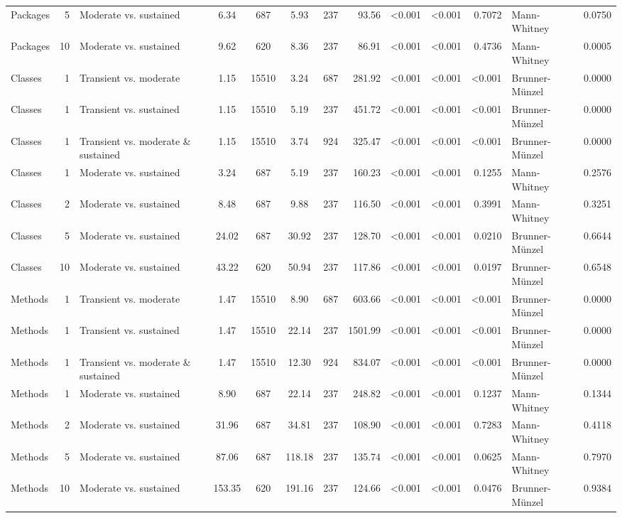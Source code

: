 \begin{table}[H]
{\begin{tabular}{l r p{4cm} c c c c r r r r l r}
Packages & 5 & Moderate vs. sustained &  6.34 & 687 & 5.93 & 237 & 93.56 & \textless 0.001 & \textless 0.001 & 0.7072 &  Mann-Whitney & 0.0750 \\ 
Packages & 10 & Moderate vs. sustained &  9.62 & 620 & 8.36 & 237 & 86.91 & \textless 0.001 & \textless 0.001 & 0.4736 &  Mann-Whitney & 0.0005 \\ 
Classes & 1 & Transient vs. moderate &  1.15 & 15510 & 3.24 & 687 & 281.92 & \textless 0.001 & \textless 0.001 & \textless 0.001 &  Brunner-Münzel & 0.0000 \\ 
Classes & 1 & Transient vs. sustained &  1.15 & 15510 & 5.19 & 237 & 451.72 & \textless 0.001 & \textless 0.001 & \textless 0.001 &  Brunner-Münzel & 0.0000 \\ 
Classes & 1 & Transient vs. moderate \& sustained &  1.15 & 15510 & 3.74 & 924 & 325.47 & \textless 0.001 & \textless 0.001 & \textless 0.001 &  Brunner-Münzel & 0.0000 \\ 
Classes & 1 & Moderate vs. sustained &  3.24 & 687 & 5.19 & 237 & 160.23 & \textless 0.001 & \textless 0.001 & 0.1255 &  Mann-Whitney & 0.2576 \\ 
Classes & 2 & Moderate vs. sustained &  8.48 & 687 & 9.88 & 237 & 116.50 & \textless 0.001 & \textless 0.001 & 0.3991 &  Mann-Whitney & 0.3251 \\ 
Classes & 5 & Moderate vs. sustained &  24.02 & 687 & 30.92 & 237 & 128.70 & \textless 0.001 & \textless 0.001 & 0.0210 &  Brunner-Münzel & 0.6644 \\ 
Classes & 10 & Moderate vs. sustained &  43.22 & 620 & 50.94 & 237 & 117.86 & \textless 0.001 & \textless 0.001 & 0.0197 &  Brunner-Münzel & 0.6548 \\ 
Methods & 1 & Transient vs. moderate &  1.47 & 15510 & 8.90 & 687 & 603.66 & \textless 0.001 & \textless 0.001 & \textless 0.001 &  Brunner-Münzel & 0.0000 \\ 
Methods & 1 & Transient vs. sustained &  1.47 & 15510 & 22.14 & 237 & 1501.99 & \textless 0.001 & \textless 0.001 & \textless 0.001 &  Brunner-Münzel & 0.0000 \\ 
Methods & 1 & Transient vs. moderate \& sustained &  1.47 & 15510 & 12.30 & 924 & 834.07 & \textless 0.001 & \textless 0.001 & \textless 0.001 &  Brunner-Münzel & 0.0000 \\ 
Methods & 1 & Moderate vs. sustained &  8.90 & 687 & 22.14 & 237 & 248.82 & \textless 0.001 & \textless 0.001 & 0.1237 &  Mann-Whitney & 0.1344 \\ 
Methods & 2 & Moderate vs. sustained &  31.96 & 687 & 34.81 & 237 & 108.90 & \textless 0.001 & \textless 0.001 & 0.7283 &  Mann-Whitney & 0.4118 \\ 
Methods & 5 & Moderate vs. sustained &  87.06 & 687 & 118.18 & 237 & 135.74 & \textless 0.001 & \textless 0.001 & 0.0625 &  Mann-Whitney & 0.7970 \\ 
Methods & 10 & Moderate vs. sustained &  153.35 & 620 & 191.16 & 237 & 124.66 & \textless 0.001 & \textless 0.001 & 0.0476 &  Brunner-Münzel & 0.9384 \\ 
\bottomrule
\end{tabular}%
} 
\end{table}
\newpage 
